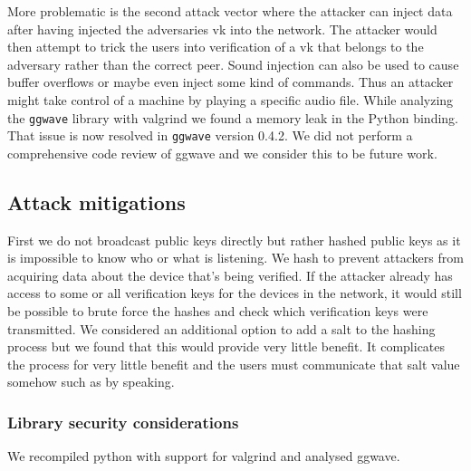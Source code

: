 \documentclass[a4paper,11pt]{report}
\begin{document}
More problematic is the second attack vector where the attacker can inject data after having injected the adversaries vk into the network. The attacker would then attempt to trick the users into verification of a vk that belongs to the adversary rather than the correct peer.
Sound injection can also be used to cause buffer overflows or maybe even inject some kind of commands. Thus an attacker might take control of a machine by playing a specific audio file.
While analyzing the \texttt{ggwave} library with valgrind we found a memory leak in the Python binding. That issue is now resolved in \texttt{ggwave} version 0.4.2.  We did not perform a comprehensive code review of ggwave and we consider this to be future work.
\subsection{Attack mitigations}
First we do not broadcast public keys directly but rather hashed public keys as it is impossible to know who or what is listening. We hash to prevent attackers from acquiring data about the device that's being verified. If the attacker already has access to some or all verification keys for the devices in the network, it would still be possible to brute force the hashes and check which verification keys were transmitted.
We considered an additional option to add a salt to the hashing process but we found that this would provide very little benefit. It complicates the process for very little benefit and the users must communicate that salt value somehow such as by speaking.
\subsubsection{Library security considerations}
We recompiled python with support for valgrind and analysed ggwave.
\end{document}

